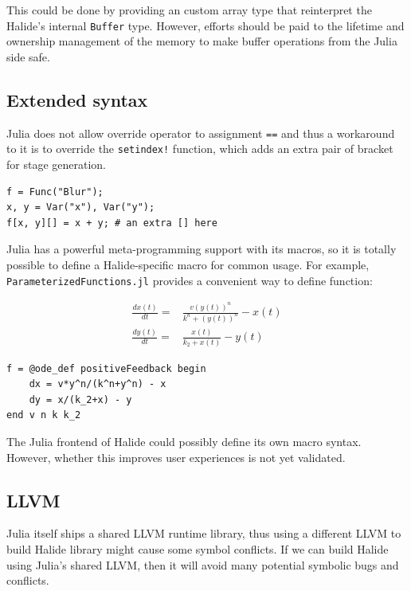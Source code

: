 \documentclass{article}
\begin{document}
This could be done by providing an custom array type that reinterpret the Halide's internal \lstinline{Buffer} type. However, efforts should be paid to the lifetime and ownership management of the memory to make buffer operations from the Julia side safe.

\subsection{Extended syntax}

Julia does not allow override operator to assignment \lstinline{==} and thus a workaround to it is to override the \lstinline{setindex!} function, which adds an extra pair of bracket for stage generation.

\begin{lstlisting}[language=JuliaLocal]
f = Func("Blur");
x, y = Var("x"), Var("y");
f[x, y][] = x + y; # an extra [] here
\end{lstlisting}

Julia has a powerful meta-programming support with its macros, so it is totally possible to define a Halide-specific macro for common usage. For example, \lstinline{ParameterizedFunctions.jl} provides a convenient way to define function:

\begin{align*}
\frac{dx(t)}{dt} =& \frac{v \left( y\left( t \right) \right)^{n}}{k^{n} + \left( y\left( t \right) \right)^{n}} - x\left( t \right) \\
\frac{dy(t)}{dt} =& \frac{x\left( t \right)}{k_{2} + x\left( t \right)} - y\left( t \right)
\end{align*}

\begin{lstlisting}[language=JuliaLocal]
f = @ode_def positiveFeedback begin
    dx = v*y^n/(k^n+y^n) - x
    dy = x/(k_2+x) - y
end v n k k_2
\end{lstlisting}

The Julia frontend of Halide could possibly define its own macro syntax. However, whether this improves user experiences is not yet validated.


\subsection{LLVM}

Julia itself ships a shared LLVM runtime library, thus using a different LLVM to build Halide library might cause some symbol conflicts. If we can build Halide using Julia's shared LLVM, then it will avoid many potential symbolic bugs and conflicts.
\end{document}
